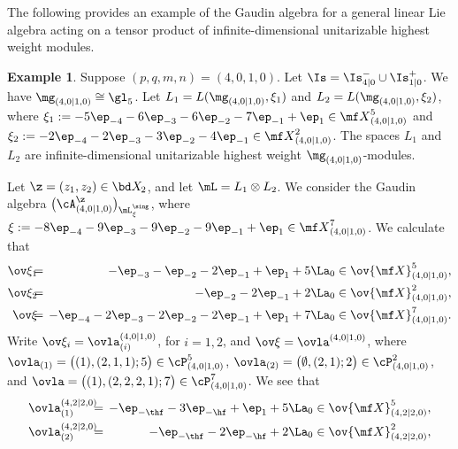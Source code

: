 \documentclass[11pt, reqno]{amsart}
\theoremstyle{definition}
\newtheorem{ex}[thm]{Example}
\theoremstyle{remark}
\numberwithin{equation}{section}
\begin{document}
The following provides an example of the Gaudin algebra for a general linear Lie algebra acting on a tensor product of infinite-dimensional unitarizable highest weight modules.

\begin{ex}
Suppose $(p,q,m,n)=(4,0,1,0)$.
Let  $\Is=\Is^{-}_{4|0} \cup \Is^{+}_{1|0}$.
We have $\mg_{(4,0|1,0)} \cong \gl_5$.
Let $L_1=L(\mg_{(4,0|1,0)},\xi_1)$ and $L_2= L(\mg_{(4,0|1,0)},\xi_2)$, where $\xi_1:=-5\ep_{-4}-6\ep_{-3}-6\ep_{-2}-7\ep_{-1}+\ep_1 \in {\mf X}^5_{(4,0|1,0)}$ and $\xi_2:=-2\ep_{-4}-2\ep_{-3}-3\ep_{-2}-4\ep_{-1}  \in {\mf X}^2_{(4,0|1,0)}$.
The spaces $L_1$ and $L_2$ are infinite-dimensional unitarizable highest weight $\mg_{(4,0|1,0)}$-modules.

Let $\z=(z_1, z_2) \in {\bd X}_{\! 2}$, and let $\mL=L_1 \otimes L_2$.
We consider the Gaudin algebra $\big(\cA_{(4,0|1,0)}^\z\big)_{\mL^\sing_{\xi}}$, where $\xi:=-8\ep_{-4}-9\ep_{-3}-9\ep_{-2}-9\ep_{-1}+\ep_1 \in {\mf X}^7_{(4,0|1,0)}$.
We calculate that
\begin{eqnarray*}
\ov\xi_1\hspace{-2mm} &=& \hspace{-2mm} -\ep_{-3}-\ep_{-2}-2\ep_{-1}+\ep_1+5 \La_0 \in \ov{\mf X}^5_{(4,0|1,0)} , \\
\ov\xi_2 \hspace{-2mm} &=& \hspace{-2mm} -\ep_{-2}-2\ep_{-1}+2 \La_0 \in \ov{\mf X}^2_{(4,0|1,0)}, \\
\ov\xi \hspace{-2mm} &=& \hspace{-2mm} -\ep_{-4}-2\ep_{-3}-2\ep_{-2}-2\ep_{-1}+\ep_1 +7 \La_0 \in \ov{\mf X}^7_{(4,0|1,0)}.
\end{eqnarray*}
Write $\ov\xi_i=\ovla_{(i)}^{(4,0|1,0)}$, for $i=1, 2$, and $\ov\xi=\ovla^{(4,0|1,0)} $, where
$\ovla_{(1)}=\big((1), (2, 1,1); 5 \big)\in \cP^5_{(4,0|1,0)}$,
$\ovla_{(2)}=\big(\emptyset, (2, 1); 2 \big)\in \cP^2_{(4,0|1,0)}$, and
$\ovla=\big((1), (2, 2, 2,1); 7 \big)\in \cP^7_{(4,0|1,0)}$.
We see that
\begin{eqnarray*}
\ovla_{(1)}^{(4,2|2,0)} \hspace{-2mm} &=& \hspace{-2mm} -\ep_{-\thf}-3\ep_{-\hf}+\ep_1+5 \La_0 \in \ov{\mf X}^5_{(4,2|2,0)}, \\
\ovla_{(2)}^{(4,2|2,0)} \hspace{-2mm} &=& \hspace{-2mm} -\ep_{-\thf}-2\ep_{-\hf}+2 \La_0 \in \ov{\mf X}^2_{(4,2|2,0)}, \\

\end{eqnarray*}
\end{ex}
\end{document}
